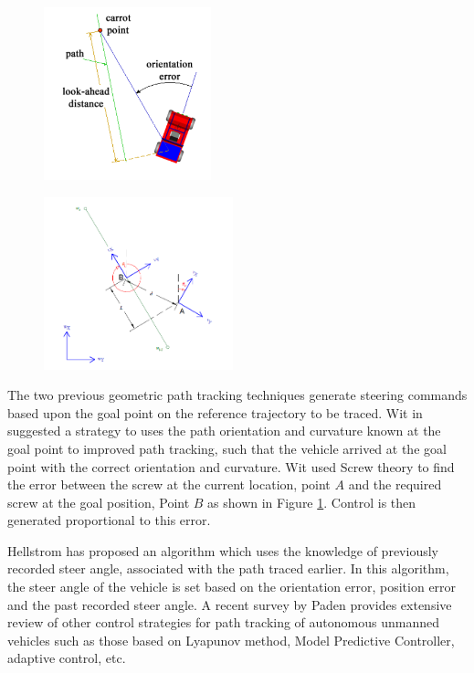 \begin{figure}
	\centering
	\begin{minipage}{.5\textwidth}
		\centering
		\includegraphics[height=5cm,keepaspectratio]{Chapter2/fig/FollowTheCarrot}
		\label{fig:FollowCarrot}
	\end{minipage}%
	\begin{minipage}{.5\textwidth}
		\centering
		\includegraphics[width=1\linewidth,height=5cm,keepaspectratio]{Chapter2/fig/VectorPursuit}
		\label{fig:VectorPursuit}
	\end{minipage}
\end{figure}
The two previous geometric path tracking techniques  generate steering commands based upon the goal point on the reference trajectory to be traced. 
Wit in \cite{wit2004autonomous} suggested a strategy to uses the path orientation and curvature  known at the goal point to improved path tracking,  such that the vehicle arrived at the goal point  with the correct orientation and curvature. Wit used Screw theory to find the error between the screw at the current location, point $A$  and the required screw at the goal position, Point $B $ as shown in Figure \ref{fig:VectorPursuit}. Control is then generated proportional to this error.

Hellstrom \cite{hellstrom2006follow} has proposed an algorithm which uses the knowledge of previously recorded steer angle, associated with  the path traced earlier. In this algorithm, the steer angle of the vehicle is set based on the orientation error, position error and the past recorded steer angle. A recent survey by Paden \cite{paden2016survey} provides extensive review of other control strategies for path tracking of autonomous unmanned vehicles such as those based on Lyapunov method, Model Predictive Controller, adaptive control, etc. 


